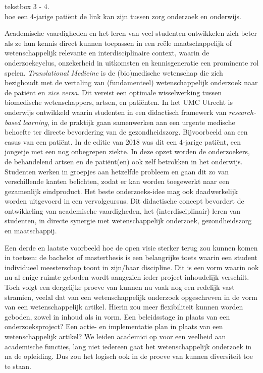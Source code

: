 \documentclass[empirical, authordate, ]{new-jote-article}
\begin{document}
	\begin{bookbox}{\raggedright tekstbox 3 - 4. \\hoe een 4-jarige patiënt de link kan zijn tussen zorg onderzoek en onderwijs.}
		Academische vaardigheden en het leren van veel studenten ontwikkelen zich beter als ze hun kennis direct kunnen toepassen in een reële maatschappelijk of wetenschappelijk relevante en interdisciplinaire context, waarin de onderzoekcyclus, onzekerheid in uitkomsten en kennisgeneratie een prominente rol spelen. \emph{Translational}\emph{ }\emph{Medicine} is de (bio)medische wetenschap die zich bezighoudt met de vertaling van (fundamenteel) wetenschappelijk onderzoek naar de patiënt en \emph{vice}\emph{ versa}. Dit vereist een optimale wisselwerking tussen biomedische wetenschappers, artsen, en patiënten. In het UMC Utrecht is onderwijs ontwikkeld waarin studenten in een didactisch framewerk van \emph{research-}\emph{based}\emph{ }\emph{learning}, in de praktijk gaan samenwerken aan een urgente medische behoefte ter directe bevordering van de gezondheidszorg. Bijvoorbeeld aan een casus van een patiënt. In de editie van 2018 was dit een 4-jarige patiënt, een jongetje met een nog onbegrepen ziekte. In deze opzet worden de onderzoekers, de behandelend artsen en de patiënt(en) ook zelf betrokken in het onderwijs. Studenten werken in groepjes aan hetzelfde probleem en gaan dit zo van verschillende kanten belichten, zodat er kan worden toegewerkt naar een gezamenlijk eindproduct. Het beste onderzoeks-idee mag ook daadwerkelijk worden uitgevoerd in een vervolgcursus. Dit didactische concept bevordert de ontwikkeling van academische vaardigheden, het (interdisciplinair) leren van studenten, in directe synergie met wetenschappelijk onderzoek, gezondheidszorg en maatschappij.
	\end{bookbox}

	Een derde en laatste voorbeeld hoe de open visie sterker terug zou kunnen komen in toetsen: de bachelor of masterthesis is een belangrijke toets waarin een student individueel meesterschap toont in zijn/haar discipline. Dit is een vorm waarin ook nu al enige ruimte geboden wordt aangezien ieder project inhoudelijk verschilt. Toch volgt een dergelijke proeve van kunnen nu vaak nog een redelijk vast stramien, veelal dat van een wetenschappelijk onderzoek opgeschreven in de vorm van een wetenschappelijk artikel. Hierin zou meer flexibiliteit kunnen worden geboden, zowel in inhoud als in vorm. Een beleidsstage in plaats van een onderzoeksproject? Een actie- en implementatie plan in plaats van een wetenschappelijk artikel? We leiden academici op voor een veelheid aan academische functies, lang niet iedereen gaat het wetenschappelijk onderzoek in na de opleiding. Dus zou het logisch ook in de proeve van kunnen diversiteit toe te staan.
\end{document}
